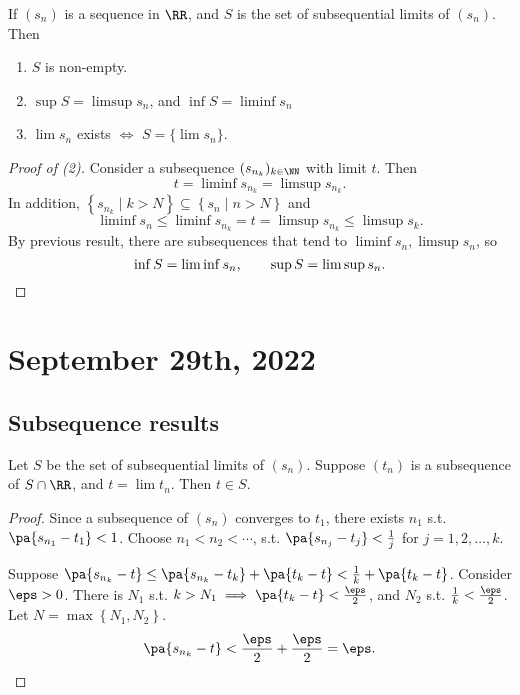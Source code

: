\documentclass[11pt]{scrartcl}
\numberwithin{equation}{section}
\begin{document}
\begin{theorem}
    If $(s_n)$ is a sequence in $\RR$, and $S$ is the set of 
    subsequential limits of $(s_n)$.
    Then 
    \begin{enumerate}
        \item $S$ is non-empty.
        \item $\sup S= \limsup s_n$, and $\inf S= \liminf s_n$
        \item $\lim s_n$ exists $\iff$ $S = \{\lim s_n\}$.
    \end{enumerate}
\end{theorem}
\begin{proof}
    [Proof of (2)]
    Consider a subsequence $(s_{n_k})_{k\in\NN}$ with limit $t$.
    Then 
    \[ t = \liminf s_{n_k} = \limsup s_{n_k}.\]
    In addition, $\left\{s_{n_k}\mid k > N\right\}\subseteq \left\{s_n\mid n > N\right\}$ and 
    \[ 
        \liminf s_n \leq\liminf s_{n_k} = t=\limsup s_{n_k} \leq \limsup s_k.
    \]
    By previous result, there are subsequences that tend to 
    $\liminf s_n, \limsup s_n$, so 
    \[ \inf S = \liminf s_n, \qquad \sup S = \limsup s_n.\qedhere\]
\end{proof}

\clearpage
\section{September 29th, 2022}
\subsection{Subsequence results}

\begin{theorem}
    \label{thm:subseqlimclosed}
    Let $S$ be the set of subsequential limits of $(s_n)$.
    Suppose $(t_n)$ is a subsequence of $S\cap\RR$, and $t = \lim t_n$.
    Then $t \in S$.
\end{theorem}

\begin{proof}
    Since a subsequence of $(s_n)$ converges to $t_1$, there exists 
    $n_1$ s.t. $\pa{s_{n_1} - t_1} < 1$. Choose $n_1<n_2<\cdots$, s.t. 
    $\pa{s_{n_j} - t_j} < \frac{1}{j}$ for $j =1,2,\dots,k$.

    Suppose $\pa{s_{n_k}-t} \leq \pa{s_{n_k}-t_k} + \pa{t_k-t} < \frac{1}{k}+\pa{t_k-t}$.
    Consider $\eps > 0$. There is $N_1$ s.t. 
    $k>N_1 \implies \pa{t_k-t} < \frac{\eps}{2}$, and
    $N_2$ s.t. $\frac{1}{k}< \frac{\eps}{2}$. 
    Let $N = \max \left\{N_1, N_2\right\}$. 
    \[ \pa{s_{n_k} - t} < \frac{\eps}{2} + \frac{\eps}{2} = \eps. \qedhere\]
\end{proof}
\end{document}
